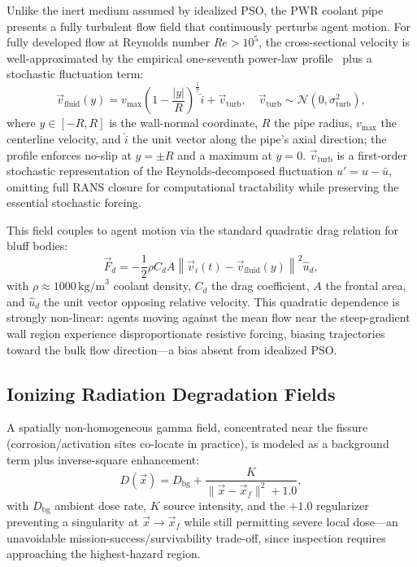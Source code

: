 \documentclass[conference]{IEEEtran}
\begin{document}
Unlike the inert medium assumed by idealized PSO, the PWR coolant pipe presents a fully turbulent flow field that continuously perturbs agent motion. For fully developed flow at Reynolds number $Re>10^5$, the cross-sectional velocity is well-approximated by the empirical one-seventh power-law profile~\cite{turbulent_flow} plus a stochastic fluctuation term:
\begin{equation}
\vec{v}_{\text{fluid}}(y) = v_{\max}\left(1 - \frac{|y|}{R}\right)^{\frac{1}{7}}\hat{i} + \vec{v}_{\text{turb}}, \quad \vec{v}_{\text{turb}} \sim \mathcal{N}(0,\sigma_{\text{turb}}^2),
\label{eq:vfluid}
\end{equation}
where $y\in[-R,R]$ is the wall-normal coordinate, $R$ the pipe radius, $v_{\max}$ the centerline velocity, and $\hat{i}$ the unit vector along the pipe's axial direction; the profile enforces no-slip at $y=\pm R$ and a maximum at $y=0$. $\vec{v}_{\text{turb}}$ is a first-order stochastic representation of the Reynolds-decomposed fluctuation $u'=u-\bar{u}$, omitting full RANS closure for computational tractability while preserving the essential stochastic forcing.

This field couples to agent motion via the standard quadratic drag relation for bluff bodies:
\begin{equation}
\vec{F}_d = -\frac{1}{2}\rho C_d A \left\|\vec{v}_i(t) - \vec{v}_{\text{fluid}}(y)\right\|^2 \hat{u}_d,
\label{eq:drag}
\end{equation}
with $\rho\approx1000\,\text{kg/m}^3$ coolant density, $C_d$ the drag coefficient, $A$ the frontal area, and $\hat{u}_d$ the unit vector opposing relative velocity. This quadratic dependence is strongly non-linear: agents moving against the mean flow near the steep-gradient wall region experience disproportionate resistive forcing, biasing trajectories toward the bulk flow direction---a bias absent from idealized PSO.

\subsection{Ionizing Radiation Degradation Fields}
\label{sec:radiation}

A spatially non-homogeneous gamma field, concentrated near the fissure (corrosion/activation sites co-locate in practice), is modeled as a background term plus inverse-square enhancement:
\begin{equation}
D(\vec{x}) = D_{\text{bg}} + \frac{K}{\|\vec{x}-\vec{x}_f\|^2 + 1.0},
\label{eq:dose}
\end{equation}
with $D_{\text{bg}}$ ambient dose rate, $K$ source intensity, and the $+1.0$ regularizer preventing a singularity at $\vec{x}\to\vec{x}_f$ while still permitting severe local dose---an unavoidable mission-success/survivability trade-off, since inspection requires approaching the highest-hazard region.
\end{document}
